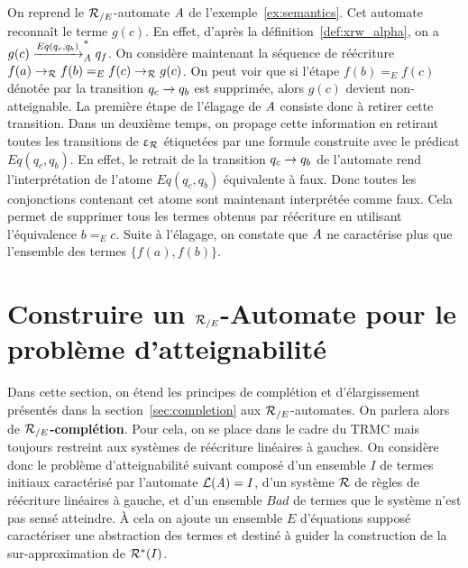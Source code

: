 \begin{example}
  \label{ex:pruning}
  On reprend le ${\mathcal R_{/E}}$-automate $\mathit A$ de l'exemple~\ref{ex:semantics}.
  Cet automate reconnaît le terme $g(c)$. En effet, d'après la
  définition~\ref{def:xrw_alpha}, on a $g(c) \xrightarrow{Eq(q_c, q_b)}_\mathit A^* q_f$. On considère maintenant la séquence de réécriture $f(a) \rightarrow_\mathcal R f(b) =_E f(c) 
  \rightarrow_\mathcal R g(c)$. On peut voir que si l'étape $f(b) =_E f(c)$ dénotée par la 
  transition $q_c \rightarrow q_b$ est supprimée, alors $g(c)$ devient non-atteignable. 
  La première étape de l'élagage de $\mathit A$ consiste donc à retirer cette
  transition. Dans un deuxième temps, on propage cette information en retirant
  toutes les transitions de $\upvarepsilon_{\mathcal R}$ étiquetées par une formule construite avec le prédicat $Eq(q_c, q_b)$.
  En effet, le retrait de la transition $q_c \rightarrow q_b$ de l'automate rend l'interprétation de l'atome $Eq(q_c, q_b)$
  équivalente à faux. Donc toutes les conjonctions contenant cet atome sont maintenant interprétée comme faux.  
  Cela permet de supprimer tous les termes obtenus par réécriture en utilisant l'équivalence $b =_E c$.
  Suite à l'élagage, on constate que $\mathit A$ ne caractérise plus que l'ensemble des termes $\{f(a), f(b)\}$.
\end{example}







\section{Construire un ${\mathcal R_{/E}}$-Automate pour le problème d'atteignabilité}


Dans cette section, on étend les principes de complétion et d'élargissement
présentés dans la section~\ref{sec:completion} aux ${\mathcal R_{/E}}$-automates.
On parlera alors de \textbf{${\mathcal R_{/E}}$-complétion}. Pour cela, on se place dans le cadre
du TRMC mais toujours restreint aux systèmes de réécriture linéaires à gauches.
On considère donc le problème d'atteignabilité suivant composé d'un ensemble
$I$ de termes initiaux caractérisé par l'automate $\mathcal{L}(\mathit A) = I$, 
d'un système $\mathcal R$ de règles de réécriture linéaires à gauche, et d'un ensemble
$Bad$ de termes que le système n'est pas sensé atteindre.
À cela on ajoute un ensemble $E$ d'équations supposé caractériser une 
abstraction des termes et destiné à guider la construction de la sur-approximation 
de $\mathcal R^*(I)$.

